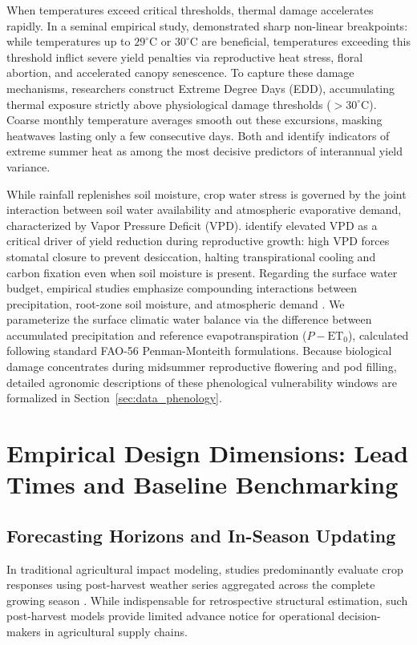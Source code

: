 When temperatures exceed critical thresholds, thermal damage accelerates rapidly. In a seminal empirical study, \citet{Schlenker2009} demonstrated sharp non-linear breakpoints: while temperatures up to $29^\circ\text{C}$ or $30^\circ\text{C}$ are beneficial, temperatures exceeding this threshold inflict severe yield penalties via reproductive heat stress, floral abortion, and accelerated canopy senescence. To capture these damage mechanisms, researchers construct Extreme Degree Days (EDD), accumulating thermal exposure strictly above physiological damage thresholds ($>30^\circ\text{C}$). Coarse monthly temperature averages smooth out these excursions, masking heatwaves lasting only a few consecutive days. Both \citet{Hoffman2020} and \citet{ChenZhang2026} identify indicators of extreme summer heat as among the most decisive predictors of interannual yield variance.

While rainfall replenishes soil moisture, crop water stress is governed by the joint interaction between soil water availability and atmospheric evaporative demand, characterized by Vapor Pressure Deficit (VPD). \citet{Hoffman2020} identify elevated VPD as a critical driver of yield reduction during reproductive growth: high VPD forces stomatal closure to prevent desiccation, halting transpirational cooling and carbon fixation even when soil moisture is present. Regarding the surface water budget, empirical studies emphasize compounding interactions between precipitation, root-zone soil moisture, and atmospheric demand \citep{ChenZhang2026, Hoffman2020, Vijverberg2023}. We parameterize the surface climatic water balance via the difference between accumulated precipitation and reference evapotranspiration ($P - \text{ET}_0$), calculated following standard FAO-56 Penman-Monteith formulations. Because biological damage concentrates during midsummer reproductive flowering and pod filling, detailed agronomic descriptions of these phenological vulnerability windows are formalized in Section~\ref{sec:data_phenology}.

\section{Empirical Design Dimensions: Lead Times and Baseline Benchmarking}
\label{sec:lit_targets_lead_times}

\subsection{Forecasting Horizons and In-Season Updating}
In traditional agricultural impact modeling, studies predominantly evaluate crop responses using post-harvest weather series aggregated across the complete growing season \citep{Schlenker2009}. While indispensable for retrospective structural estimation, such post-harvest models provide limited advance notice for operational decision-makers in agricultural supply chains. 

